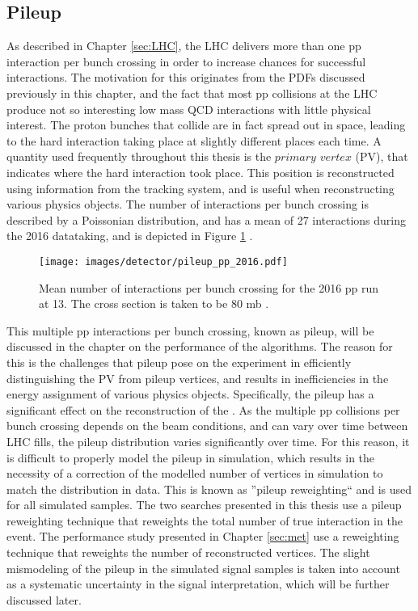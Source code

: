 \subsection*{Pileup}
\noindent
\justify
As described in Chapter \ref{sec:LHC}, the LHC delivers more than one pp interaction per bunch crossing in order to increase chances for successful interactions. 
The motivation for this originates from the PDFs discussed previously in this chapter, and the fact that most pp collisions at the LHC produce not so interesting low mass QCD interactions with little physical interest.  
The proton bunches that collide are in fact spread out in space, leading to the hard interaction taking place at slightly different places each time.
A quantity used frequently throughout this thesis is the $primary$ $vertex$ (PV), that indicates where the hard interaction took place.         
This position is reconstructed using information from the tracking system, and is useful when reconstructing various physics objects.
\newpara
\noindent\justify
The number of interactions per bunch crossing is described by a Poissonian distribution, and has a mean of 27 interactions during the 2016 datataking, and is depicted in Figure \ref{fig:pileup} \cite{lumi}.
\begin{figure}[!htp]
  \centering
   \texttt{[image: images/detector/pileup\_pp\_2016.pdf]}
   \caption{Mean number of interactions per bunch crossing for the 2016 pp run at 13\TeV. The cross section is taken to be 80 mb \cite{lumi}.}
   \label{fig:pileup}
\end{figure}
This multiple pp interactions per bunch crossing, known as pileup, will be discussed in the chapter on the performance of the \ptmiss algorithms. 
The reason for this is the challenges that pileup pose on the experiment in efficiently distinguishing the PV from pileup vertices, and results in inefficiencies in the energy assignment of various physics objects.    
Specifically, the pileup has a significant effect on the reconstruction of the \ptmiss. 
As the multiple pp collisions per bunch crossing depends on the beam conditions, and can vary over time between LHC fills, the pileup distribution varies significantly over time. 
For this reason, it is difficult to properly model the pileup in simulation, which results in the necessity of a correction of the modelled number of vertices in simulation to match the distribution in data. 
This is known as ''pileup reweighting`` and is used for all simulated samples.  
The two searches presented in this thesis use a pileup reweighting technique that reweights the total number of true interaction in the event. 
The \ptmiss performance study presented in Chapter \ref{sec:met} use a reweighting technique that reweights the number of reconstructed vertices. 
The slight mismodeling of the pileup in the simulated signal samples is taken into account as a systematic uncertainty in the signal interpretation, which will be further discussed later.                                                                                                                                                                                                                                                                                                             
